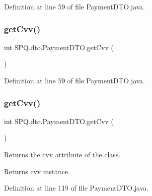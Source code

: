 Definition at line 59 of file Payment\+D\+T\+O.\+java.

\mbox{\label{class_s_p_q_1_1dto_1_1_payment_d_t_o_a64fb9df59333fcc2a0c8bea48024354d}} 
\subsubsection{\texorpdfstring{get\+Cvv()}{getCvv()}\hspace{0.1cm}{\footnotesize\ttfamily [2/3]}}
{\footnotesize\ttfamily int S\+P\+Q.\+dto.\+Payment\+D\+T\+O.\+get\+Cvv (\begin{DoxyParamCaption}{ }\end{DoxyParamCaption})}



Definition at line 59 of file Payment\+D\+T\+O.\+java.

\mbox{\label{class_s_p_q_1_1dto_1_1_payment_d_t_o_a64fb9df59333fcc2a0c8bea48024354d}} 
\subsubsection{\texorpdfstring{get\+Cvv()}{getCvv()}\hspace{0.1cm}{\footnotesize\ttfamily [3/3]}}
{\footnotesize\ttfamily int S\+P\+Q.\+dto.\+Payment\+D\+T\+O.\+get\+Cvv (\begin{DoxyParamCaption}{ }\end{DoxyParamCaption})}

Returns the cvv attribute of the class. \begin{DoxyReturn}{Returns}
cvv instance. 
\end{DoxyReturn}


Definition at line 119 of file Payment\+D\+T\+O.\+java.

